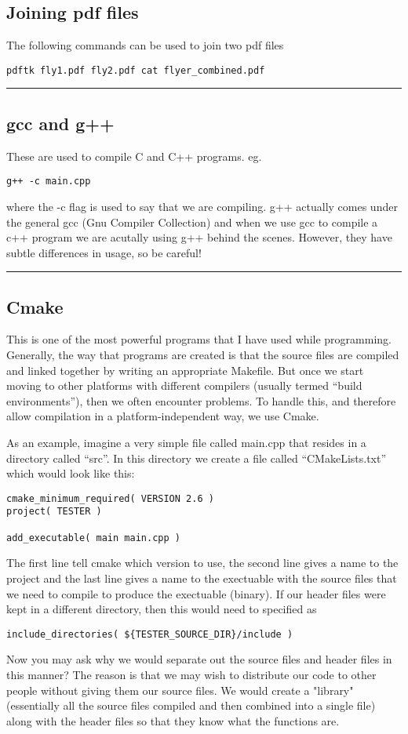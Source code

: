 \documentclass[a4paper, 10pt]{article}
\newcommand{\mybotrule}{\vspace{4mm}\hrule}
\begin{document}
\subsection*{Joining pdf files}
The following commands can be used to join two pdf files
\begin{verbatim}
pdftk fly1.pdf fly2.pdf cat flyer_combined.pdf
\end{verbatim}
\mybotrule

\subsection*{gcc and g++}
These are used to compile C and C++ programs. eg.
\begin{verbatim}
g++ -c main.cpp
\end{verbatim}
where the -c flag is used to say that we are compiling. g++ actually comes under the general gcc (Gnu Compiler Collection) and when we use gcc to compile a c++ program we are acutally using g++ behind the scenes. However, they have subtle differences in usage, so be careful!
\mybotrule

\subsection*{Cmake}
This is one of the most powerful programs that I have used while
programming. Generally, the way that programs are created is that the
source files are compiled and linked together by writing an
appropriate Makefile. But once we start moving to other platforms with
different compilers (usually termed ``build environments''), then we
often encounter problems. To handle this, and therefore allow
compilation in a platform-independent way, we use Cmake. 

As an example, imagine a very simple file called main.cpp that resides
in a directory called ``src''. In this directory we create a file
called ``CMakeLists.txt'' which would look like this:
\begin{verbatim}
cmake_minimum_required( VERSION 2.6 )
project( TESTER )

add_executable( main main.cpp )
\end{verbatim}
The first line tell cmake which version to use, the second line gives
a name to the project and the last line gives a name to
the exectuable with the source files that we need to compile to
produce the exectuable (binary). If our header files were kept in a
different directory, then this would need to specified as
\begin{verbatim}
include_directories( ${TESTER_SOURCE_DIR}/include )
\end{verbatim}
Now you may ask why we would separate out the source files and header
files in this manner? The reason is that we may wish to distribute
our code  to other people without giving them our source files. We
would create a  "library" (essentially all the source files compiled
and then combined into a single file) along with the header files so
that they know what the functions are.
\end{document}

